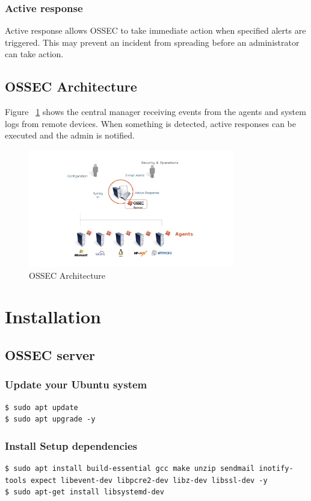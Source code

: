 \documentclass{article}
\begin{document}
\subsubsection{Active response}
Active response allows OSSEC to take immediate action when specified alerts are triggered. This may prevent an incident from spreading before an administrator can take action.
\subsection{OSSEC Architecture}
Figure ~\ref{fig: OSSEC Architecture} shows the central manager receiving events from the agents and system logs from remote devices. When something is detected, active responses can be executed and the admin is notified.
\begin{figure}
    \centering
    \includegraphics[width=0.8\textwidth]{ossec-arch.jpg}
    \caption{OSSEC Architecture}
    \label{fig: OSSEC Architecture}
\end{figure}
\section {Installation}
\subsection{OSSEC server}
\subsubsection{Update your Ubuntu system}\label{subsubsec:2.1.1}
\begin{verbatim}
$ sudo apt update
$ sudo apt upgrade -y
\end{verbatim}
\subsubsection{Install Setup dependencies}\label{subsubsec:2.1.2}
\begin{verbatim}
$ sudo apt install build-essential gcc make unzip sendmail inotify-tools expect libevent-dev libpcre2-dev libz-dev libssl-dev -y
$ sudo apt-get install libsystemd-dev
\end{verbatim}
\end{document}
